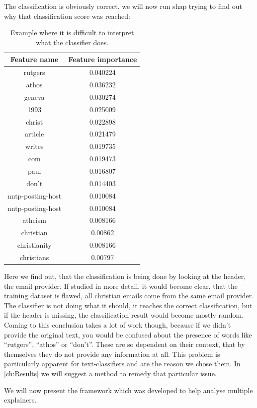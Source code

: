 The classification is obviously correct, we will now run shap trying to find out why that classification score was reached:
\begin{table}[H]
    \centering
        \begin{tabular}{c|c}
                Feature name & Feature importance \\ \hline
                rutgers & 0.040224 \\
                athos & 0.036232 \\
                geneva & 0.030274 \\
                1993 & 0.025009 \\
                christ & 0.022898 \\
                article & 0.021479 \\
                writes & 0.019735 \\
                com & 0.019473 \\
                paul & 0.016807 \\
                don't & 0.014403 \\
                nntp-posting-host & 0.010084 \\
                nntp-posting-host & 0.010084 \\
                atheism & 0.008166 \\
                christian & 0.00862 \\
                christianity & 0.008166 \\
                christians & 0.00797
            \end{tabular}
            \caption{Example where it is difficult to interpret what the classifier does.}
            \label{tab:example_bad_interpretation}
\end{table}

Here we find out, that the classification is being done by looking at the header, the email provider. If studied in more detail, it would become clear, that the training dataset is flawed, all christian emails come from the same email provider. The classifier is not doing what it should, it reaches the correct classification, but if the header is missing, the classification result would become mostly random. Coming to this conclusion takes a lot of work though, because if we didn't provide the original text, you would be confused about the presence of words like \enquote{rutgers}, \enquote{athos} or \enquote{don't}. These are so dependent on their context, that by themselves they do not provide any information at all. This problem is particularly apparent for text-classifiers and are the reason we chose them. In \autoref{ch:Results} we will suggest a method to remedy that particular issue.

\vspace{1cm}

We will now present the framework which was developed to  help analyse multiple explainers.
